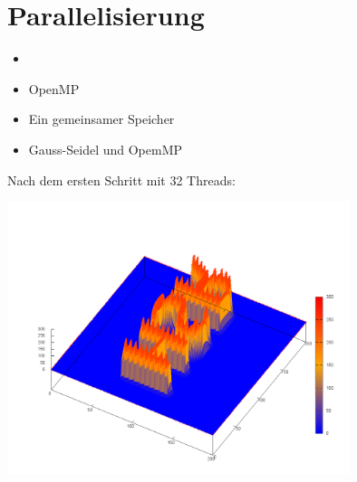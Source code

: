 \section{Parallelisierung}

\begin{frame}
	\begin{itemize}[<+->]
		\item 
		\item OpenMP
		\item Ein gemeinsamer Speicher
		\item Gauss-Seidel und OpemMP
	\end{itemize}
\end{frame}

\begin{frame}
	\centering
	Nach dem ersten Schritt mit 32 Threads:
	
	\includegraphics[width = 10cm]{../skript/images/step001}
\end{frame}
